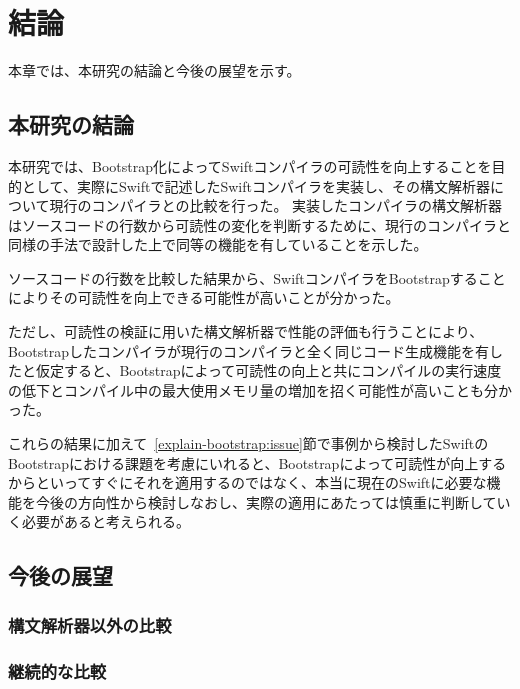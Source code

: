 \chapter{結論}
\label{conclusion}

本章では、本研究の結論と今後の展望を示す。

\section{本研究の結論}

本研究では、Bootstrap化によってSwiftコンパイラの可読性を向上することを目的として、実際にSwiftで記述したSwiftコンパイラを実装し、その構文解析器について現行のコンパイラとの比較を行った。
実装したコンパイラの構文解析器はソースコードの行数から可読性の変化を判断するために、現行のコンパイラと同様の手法で設計した上で同等の機能を有していることを示した。

ソースコードの行数を比較した結果から、SwiftコンパイラをBootstrapすることによりその可読性を向上できる可能性が高いことが分かった。

ただし、可読性の検証に用いた構文解析器で性能の評価も行うことにより、Bootstrapしたコンパイラが現行のコンパイラと全く同じコード生成機能を有したと仮定すると、Bootstrapによって可読性の向上と共にコンパイルの実行速度の低下とコンパイル中の最大使用メモリ量の増加を招く可能性が高いことも分かった。

これらの結果に加えて~\ref{explain-bootstrap:issue}節で事例から検討したSwiftのBootstrapにおける課題を考慮にいれると、Bootstrapによって可読性が向上するからといってすぐにそれを適用するのではなく、本当に現在のSwiftに必要な機能を今後の方向性から検討しなおし、実際の適用にあたっては慎重に判断していく必要があると考えられる。

\section{今後の展望}

\subsection{構文解析器以外の比較}

\subsection{継続的な比較}

